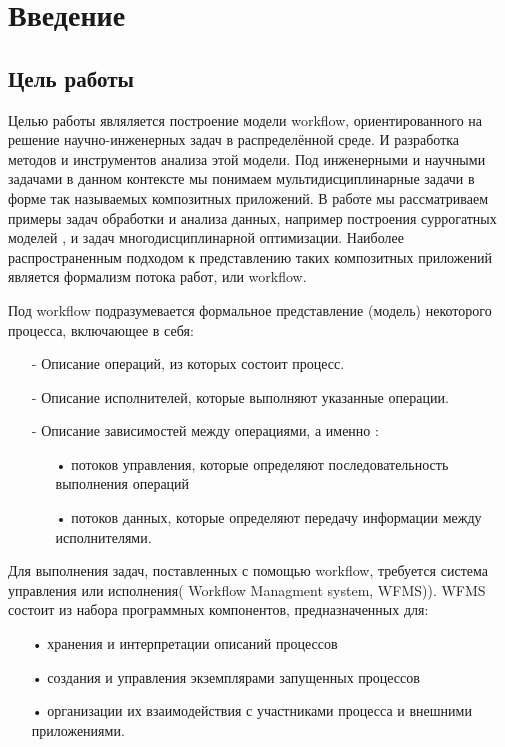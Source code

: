 \documentclass[a4paper,14pt]{article}
\begin{document}
\textwidth 15.5cm
\topmargin -1cm
\parindent 1cm
\textheight 24cm
\parskip 1.5mm



\section{Введение}
\subsection*{Цель работы}
Целью работы являляется построение модели workflow, ориентированного  на решение научно-инженерных задач в распределённой среде. И разработка методов и инструментов анализа этой модели.
 Под инженерными и научными задачами в данном контексте мы понимаем 
мультидисциплинарные задачи в форме так называемых композитных приложений. В работе мы рассматриваем примеры задач обработки и анализа данных, например построения  суррогатных моделей , и задач многодисциплинарной оптимизации. Наиболее распространенным подходом к представлению таких композитных приложений является формализм потока работ, или workflow.

Под workflow подразумевается формальное представление (модель) некоторого процесса, включающее в себя:
\begin{enumerate}
\item[-] Описание операций, из которых состоит процесс.
\item[-] Описание исполнителей, которые выполняют указанные операции.
\item[-] Описание зависимостей между операциями, а именно :
\begin{enumerate}
\item[•] потоков управления, которые определяют последовательность выполнения операций 
\item[•] потоков данных, которые
определяют передачу информации между исполнителями.
\end{enumerate}
\end{enumerate}


Для выполнения задач, поставленных с помощью workflow, требуется система управления или исполнения( Workflow Managment system, WFMS)). WFMS состоит из набора программных
компонентов, предназначенных для:
\begin{enumerate}
\item[•] хранения и интерпретации описаний
процессов 
\item[•] создания и управления экземплярами запущенных процессов
\item[•] организации их взаимодействия с участниками
процесса и внешними приложениями.
\end{enumerate}
\end{document}
